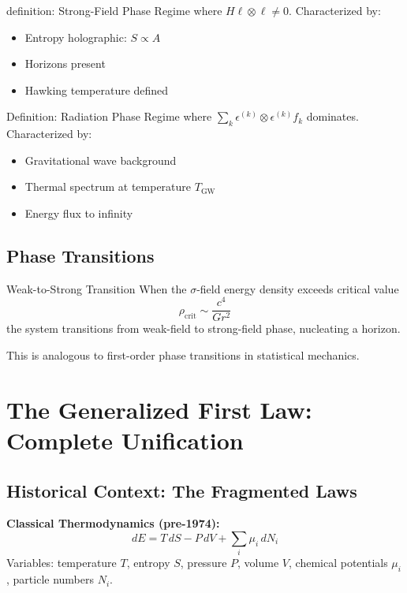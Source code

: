 \documentclass[11pt,a4paper]{article}
\theoremstyle{definition}
\theoremstyle{remark}
\begin{document}
	definition: Strong-Field Phase
		Regime where $H\ell \otimes \ell \neq 0$. Characterized by:
		\begin{itemize}
			\item Entropy holographic: $S \propto A$
			\item Horizons present
			\item Hawking temperature defined
		\end{itemize}
	
	Definition: Radiation Phase
		Regime where $\sum_k \epsilon^{(k)} \otimes \epsilon^{(k)} f_k$ dominates. Characterized by:
		\begin{itemize}
			\item Gravitational wave background
			\item Thermal spectrum at temperature $T_{\text{GW}}$
			\item Energy flux to infinity
		\end{itemize}
	
	\subsection{Phase Transitions}
	
	Weak-to-Strong Transition
		When the $\sigma$-field energy density exceeds critical value
		\begin{equation}
			\rho_{\text{crit}} \sim \frac{c^4}{G r^2}
		\end{equation}
		the system transitions from weak-field to strong-field phase, nucleating a horizon.
	
	This is analogous to first-order phase transitions in statistical mechanics.
	
	\section{The Generalized First Law: Complete Unification}
	
	\subsection{Historical Context: The Fragmented Laws}
	
	\textbf{Classical Thermodynamics (pre-1974):}
	\begin{equation}
		\boxed{dE = T\,dS - P\,dV + \sum_i \mu_i \,dN_i}
	\end{equation}
	Variables: temperature $T$, entropy $S$, pressure $P$, volume $V$, chemical potentials $\mu_i$, particle numbers $N_i$.
	
\end{document}
